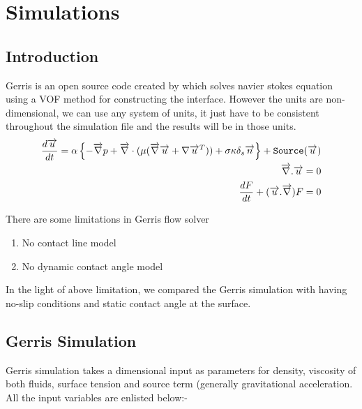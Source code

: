 
\chapter{Simulations}

\section{Introduction}
Gerris is an open source code created by \cite{Popinet2003} which solves navier stokes equation using a VOF method for constructing the interface.
However the units are non-dimensional, we can use any system of units, it just have to be consistent throughout
the simulation file and the results will be in those units.
\begin{eqnarray}
 \frac{d \overrightarrow u}{dt} = \alpha \left\{ - \overrightarrow \nabla p + \overrightarrow \nabla \cdot ( \mu (\overrightarrow \nabla \overrightarrow u + \nabla \overrightarrow u^T )) + \sigma \kappa \delta_s \overrightarrow n \right\} + { {\tt Source} }(\overrightarrow u)\\
 \overrightarrow \nabla . \overrightarrow u = 0 \\
\frac{dF}{dt}+(\overrightarrow u. \overrightarrow \nabla)F=0
\end{eqnarray}

There are some limitations in Gerris flow solver
\begin{enumerate}
 \item No contact line model
 \item No dynamic contact angle model
\end{enumerate}

In the light of above limitation, we compared the Gerris simulation with \cite{Hung2011} having no-slip conditions and static contact angle at the surface.
\section{Gerris Simulation}
Gerris simulation takes a dimensional input as parameters for density, viscosity of both fluids, surface tension and source term (generally gravitational acceleration. 
All the input variables are enlisted below:-
